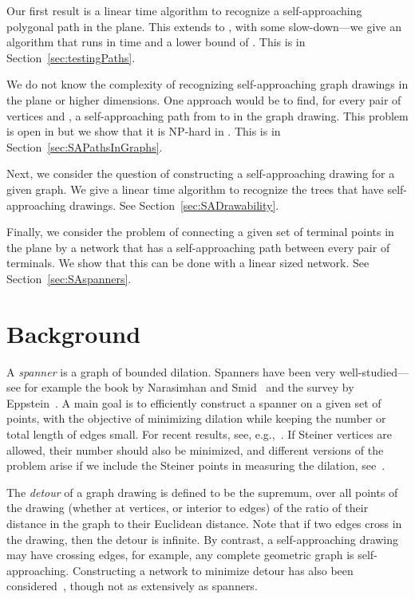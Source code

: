 \documentclass[11pt]{article}
\begin{document}
Our first result is a linear time algorithm to recognize a self-approaching polygonal path in the plane.
This extends to , with some slow-down---we give an algorithm that runs in time  and a lower bound of .  This is in Section~\ref{sec:testingPaths}.

We do not know the complexity of recognizing self-approaching graph drawings in the plane or higher dimensions.
One approach would be to find, for every pair of vertices  and , a self-approaching path from  to  in the graph drawing.   This problem is open in  but we show that it  is NP-hard in .  This is in Section~\ref{sec:SAPathsInGraphs}.


Next, we consider the question of constructing a self-approaching drawing for a given graph.  We give a linear time algorithm to recognize the trees that have self-approaching drawings.  See Section~\ref{sec:SADrawability}.


Finally,  we consider the problem of connecting a given set of terminal points in the plane by a network that has a self-approaching path between every pair of terminals.  We show that this can be done with a linear sized network.  See Section~\ref{sec:SAspanners}.












\section{Background}

A \emph{spanner} is a graph of bounded dilation.  Spanners have been very well-studied---see for example the book by Narasimhan and Smid~\cite{Spanners} and the survey by Eppstein~\cite{Eppstein:Spanners:2000}.
A main goal is to efficiently construct a spanner on a given set of points, with the objective of minimizing dilation while keeping
 the number or total length of edges small.  For recent results, see, e.g.,~\cite{Aronov:Spanners:2008,Giannopoulos:hard-spanners:2010}.
If Steiner vertices are allowed, their number should also be minimized, and different versions of the problem arise if we include the Steiner points in measuring the dilation, see~\cite{Ebbers:Dilation:2007}.

The \emph{detour} of a graph drawing is defined to be the supremum, over all points  of the drawing (whether at vertices, or interior to edges) of the ratio of their distance in the graph to their Euclidean distance.  Note  that if two edges cross in the drawing, then the detour is infinite.  By contrast,  a self-approaching drawing may have crossing edges, for example, any complete geometric graph is self-approaching.
Constructing a network to minimize detour has also been considered~\cite{Ebbers:detour:2006,Dumitrescu:2009}, though not as extensively as spanners.
\end{document}
